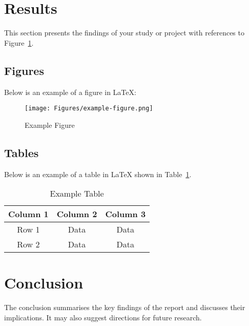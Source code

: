 \section{Results}
This section presents the findings of your study or project with references to Figure~\ref{fig:example}.

\subsection{Figures}
Below is an example of a figure in LaTeX:

\begin{figure}[H]
    \centering
    \texttt{[image: Figures/example-figure.png]} %
    \caption{Example Figure}
    \label{fig:example}
\end{figure}

\subsection{Tables}
Below is an example of a table in LaTeX shown in Table~\ref{tab:example}.

\begin{table}[H]
    \centering
    \caption{Example Table}
    \label{tab:example}
    \begin{tabular}{|c|c|c|}
        \hline
        \textbf{Column 1} & \textbf{Column 2} & \textbf{Column 3} \\
        \hline
        Row 1 & Data & Data \\
        \hline
        Row 2 & Data & Data \\
        \hline
    \end{tabular}
\end{table}


\section{Conclusion}
The conclusion summarises the key findings of the report and discusses their implications. It may also suggest directions for future research.